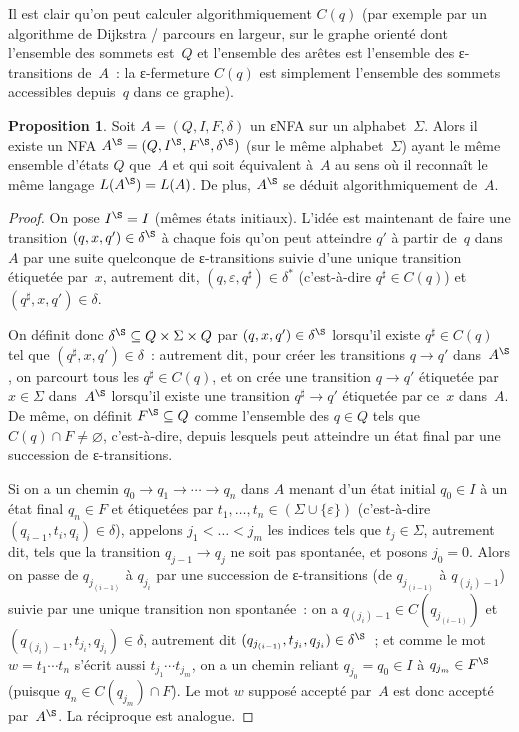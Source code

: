 \documentclass[12pt,a4paper]{article}
\theoremstyle{definition}
\newtheorem{prop}[comcnt]{Proposition}
\begin{document}
\smallskip

Il est clair qu'on peut calculer algorithmiquement $C(q)$ (par exemple
par un algorithme de Dijkstra / parcours en largeur, sur le graphe
orienté dont l'ensemble des sommets est $Q$ et l'ensemble des arêtes
est l'ensemble des ε-transitions de $A$ : la ε-fermeture $C(q)$ est
simplement l'ensemble des sommets accessibles depuis $q$ dans ce
graphe).

\begin{prop}\label{removal-of-epsilon-transitions}
Soit $A = (Q,I,F,\delta)$ un εNFA sur un alphabet $\Sigma$.  Alors il
existe un NFA $A^\S = (Q,I^\S,F^\S,\delta^\S)$ (sur le même
alphabet $\Sigma$) ayant le même ensemble d'états $Q$ que $A$ et qui
soit équivalent à $A$ au sens où il reconnaît le même langage
$L(A^\S) = L(A)$.  De plus, $A^\S$ se déduit algorithmiquement de $A$.
\end{prop}
\begin{proof}
On pose $I^\S = I$ (mêmes états initiaux).  L'idée est maintenant de
faire une transition $(q,x,q') \in \delta^\S$ à chaque fois qu'on peut
atteindre $q'$ à partir de $q$ dans $A$ par une suite quelconque de
ε-transitions suivie d'une unique transition étiquetée par $x$,
autrement dit, $(q,\varepsilon,q^\sharp) \in \delta^*$ (c'est-à-dire
$q^\sharp \in C(q)$) et $(q^\sharp,x,q') \in \delta$.

On définit donc $\delta^\S \subseteq Q\times\Sigma\times Q$ par
$(q,x,q') \in \delta^\S$ lorsqu'il existe $q^\sharp \in C(q)$ tel que
$(q^\sharp,x,q') \in \delta$ : autrement dit, pour créer les
transitions $q\to q'$ dans $A^\S$, on parcourt tous les $q^\sharp \in
C(q)$, et on crée une transition $q\to q'$ étiquetée par $x \in \Sigma$
dans $A^\S$ lorsqu'il existe une transition $q^\sharp\to q'$ étiquetée
par ce $x$ dans $A$.  De même, on définit $F^\S \subseteq Q$ comme
l'ensemble des $q\in Q$ tels que $C(q) \cap F \neq \varnothing$,
c'est-à-dire, depuis lesquels peut atteindre un état final par une
succession de ε-transitions.

Si on a un chemin $q_0 \to q_1 \to \cdots \to q_n$ dans $A$ menant
d'un état initial $q_0 \in I$ à un état final $q_n \in F$ et
étiquetées par $t_1,\ldots,t_n \in (\Sigma\cup\{\varepsilon\})$
(c'est-à-dire $(q_{i-1},t_i,q_i) \in \delta$), appelons
$j_1<\ldots<j_m$ les indices tels que $t_j \in\Sigma$, autrement dit,
tels que la transition $q_{j-1} \to q_j$ ne soit pas spontanée, et
posons $j_0 = 0$.  Alors on passe de $q_{j_{(i-1)}}$ à $q_{j_i}$ par une
succession de ε-transitions (de $q_{j_{(i-1)}}$ à $q_{(j_i)-1}$) suivie
par une unique transition non spontanée : on a $q_{(j_i)-1} \in
C(q_{j_{(i-1)}})$ et $(q_{(j_i)-1},t_{j_i},q_{j_i}) \in \delta$,
autrement dit $(q_{j_{(i-1)}},t_{j_i},q_{j_i}) \in \delta^\S$ ; et comme
le mot $w = t_1\cdots t_n$ s'écrit aussi $t_{j_1}\cdots t_{j_m}$, on a
un chemin reliant $q_{j_0} = q_0 \in I$ à $q_{j_m} \in F^\S$ (puisque
$q_n \in C(q_{j_m}) \cap F$).  Le mot $w$ supposé accepté par $A$ est
donc accepté par $A^\S$.  La réciproque est analogue.
\end{proof}
\end{document}
